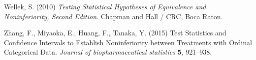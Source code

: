 \documentclass[bimj,fleqn]{w-art}\usepackage[]{graphicx}\usepackage[]{color}
\theoremstyle{plain}
\theoremstyle{definition}
\begin{document}
\begin{thebibliography}{10}
Wellek, S. (2010) \textit{Testing Statistical Hypotheses of Equivalence and
Noninferiority, Second Edition}.
Chapman and Hall / CRC, Boca Raton.

Zhang, F., Miyaoka, E., Huang, F.,  Tanaka, Y. (2015)  Test Statistics and
Confidence Intervals to Establish Noninferiority between Treatments with Ordinal
Categorical Data. \textit{Journal of biopharmaceutical statistics} \textbf{5}, 921--938.



\end{thebibliography}
\phantom{aaaa}
\end{document}
